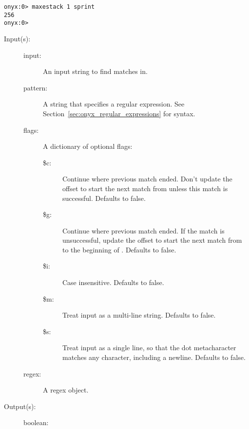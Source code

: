 \begin{description}
\begin{description}
\begin{verbatim}
onyx:0> maxestack 1 sprint
256
onyx:0>
		\end{verbatim}
	\end{description}
\label{systemdict:match}
\item[{\onyxop{input pattern flags}{match}{boolean}}: ]
\item[{\onyxop{input pattern}{match}{boolean}}: ]
\item[{\onyxop{input regex}{match}{boolean}}: ]
	\begin{description}\item[]
	\item[Input(s): ]
		\begin{description}\item[]
		\item[input: ]
			An input string to find matches in.
		\item[pattern: ]
			A string that specifies a regular expression.  See
			Section~\ref{sec:onyx_regular_expressions} for syntax.
		\item[flags: ]
			A dictionary of optional flags:
			\begin{description}%
			\item[\$c: ]
				Continue where previous match ended.  Don't
				update the offset to start the next match from
				unless this match is successful.  Defaults to
				false.
			\item[\$g: ]
				Continue where previous match ended.  If the
				match is unsuccessful, update the offset to
				start the next match from to the beginning of
				.  Defaults to false.
			\item[\$i: ] Case insensitive.  Defaults to false.
			\item[\$m: ] Treat input as a multi-line string.
				Defaults to false.
			\item[\$s: ] Treat input as a single line, so that
				the dot metacharacter matches any character,
				including a newline.  Defaults to false.
			\end{description}
		\item[regex: ]
			A regex object.
		\end{description}
	\item[Output(s): ]
		\begin{description}\item[]
		\item[boolean: ]
			\begin{description}\item[]

\end{description}
\end{description}
\end{description}
\end{description}
